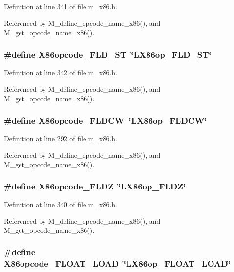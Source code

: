 Definition at line 341 of file m\_\-x86.h.

Referenced by M\_\-define\_\-opcode\_\-name\_\-x86(), and M\_\-get\_\-opcode\_\-name\_\-x86().
\subsubsection{\setlength{\rightskip}{0pt plus 5cm}\#define X86opcode\_\-FLD\_\-ST~\char`\"{}LX86op\_\-FLD\_\-ST\char`\"{}}\label{m__x86_8h_babb83cdee24136d704ad0f78e7c98de}




Definition at line 342 of file m\_\-x86.h.

Referenced by M\_\-define\_\-opcode\_\-name\_\-x86(), and M\_\-get\_\-opcode\_\-name\_\-x86().
\subsubsection{\setlength{\rightskip}{0pt plus 5cm}\#define X86opcode\_\-FLDCW~\char`\"{}LX86op\_\-FLDCW\char`\"{}}\label{m__x86_8h_a90f78440cf5bb273602e0c51f4829b3}




Definition at line 292 of file m\_\-x86.h.

Referenced by M\_\-define\_\-opcode\_\-name\_\-x86(), and M\_\-get\_\-opcode\_\-name\_\-x86().
\subsubsection{\setlength{\rightskip}{0pt plus 5cm}\#define X86opcode\_\-FLDZ~\char`\"{}LX86op\_\-FLDZ\char`\"{}}\label{m__x86_8h_761e165b1da9d682999f50dbbc6d5d01}




Definition at line 340 of file m\_\-x86.h.

Referenced by M\_\-define\_\-opcode\_\-name\_\-x86(), and M\_\-get\_\-opcode\_\-name\_\-x86().
\subsubsection{\setlength{\rightskip}{0pt plus 5cm}\#define X86opcode\_\-FLOAT\_\-LOAD~\char`\"{}LX86op\_\-FLOAT\_\-LOAD\char`\"{}}\label{m__x86_8h_a8abc477aabe4d724f1fe97fc781f070}




